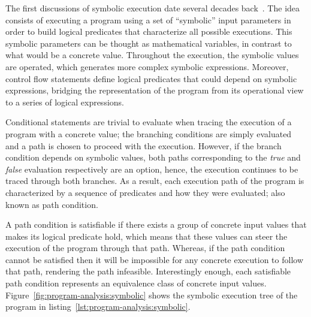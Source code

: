 



The first discussions of symbolic execution date several decades back~\cite{Hoare1969,King1976}. The idea consists of executing a program using a set of ``symbolic'' input parameters in order to build logical predicates that characterize all possible executions. This symbolic parameters can be thought as mathematical variables, in contrast to what would be a concrete value. Throughout the execution, the symbolic values are operated, which generates more complex symbolic expressions. Moreover, control flow statements define logical predicates that could depend on symbolic expressions, bridging the representation of the program from its operational view to a series of logical expressions. %

Conditional statements are trivial to evaluate when tracing the execution of a program with a concrete value; the branching conditions are simply evaluated and a path is chosen to proceed with the execution. However, if the branch condition depends on symbolic values, both paths corresponding to the \textit{true} and \textit{false} evaluation respectively are an option, hence, the execution continues to be traced through both branches. As a result, each execution path of the program is characterized by a sequence of predicates and how they were evaluated; also known as path condition.

A path condition is satisfiable if there exists a group of concrete input values that makes its logical predicate hold, which means that these values can steer the execution of the program through that path. Whereas, if the path condition cannot be satisfied then it will be impossible for any concrete execution to follow that path, rendering the path infeasible. Interestingly enough, each satisfiable path condition represents an equivalence class of concrete input values.
Figure~\ref{fig:program-analysis:symbolic} shows the symbolic execution tree of the program in listing~\ref{lst:program-analysis:symbolic}.

